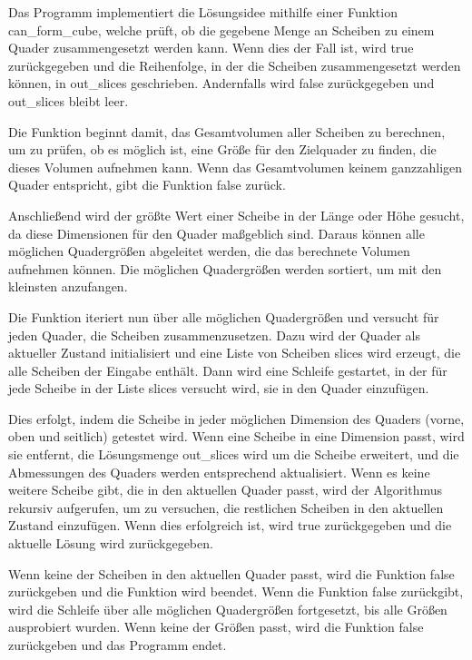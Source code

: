\documentclass[a4paper,10pt,ngerman]{scrartcl}
\begin{document}
    Das Programm implementiert die Lösungsidee mithilfe einer Funktion can_form_cube, welche prüft, ob die gegebene Menge an Scheiben zu einem Quader zusammengesetzt werden kann.
    Wenn dies der Fall ist, wird true zurückgegeben und die Reihenfolge, in der die Scheiben zusammengesetzt werden können, in out_slices geschrieben.
    Andernfalls wird false zurückgegeben und out_slices bleibt leer.

    Die Funktion beginnt damit, das Gesamtvolumen aller Scheiben zu berechnen, um zu prüfen, ob es möglich ist, eine Größe für den Zielquader zu finden, die dieses Volumen aufnehmen kann. Wenn das Gesamtvolumen keinem ganzzahligen Quader entspricht, gibt die Funktion false zurück.

    Anschließend wird der größte Wert einer Scheibe in der Länge oder Höhe gesucht, da diese Dimensionen für den Quader maßgeblich sind.
    Daraus können alle möglichen Quadergrößen abgeleitet werden, die das berechnete Volumen aufnehmen können.
    Die möglichen Quadergrößen werden sortiert, um mit den kleinsten anzufangen.

    Die Funktion iteriert nun über alle möglichen Quadergrößen und versucht für jeden Quader, die Scheiben zusammenzusetzen.
    Dazu wird der Quader als aktueller Zustand initialisiert und eine Liste von Scheiben slices wird erzeugt, die alle Scheiben der Eingabe enthält.
    Dann wird eine Schleife gestartet, in der für jede Scheibe in der Liste slices versucht wird, sie in den Quader einzufügen.

    Dies erfolgt, indem die Scheibe in jeder möglichen Dimension des Quaders (vorne, oben und seitlich) getestet wird.
    Wenn eine Scheibe in eine Dimension passt, wird sie entfernt, die Lösungsmenge out_slices wird um die Scheibe erweitert, und die Abmessungen des Quaders werden entsprechend aktualisiert. Wenn es keine weitere Scheibe gibt, die in den aktuellen Quader passt, wird der Algorithmus rekursiv aufgerufen, um zu versuchen, die restlichen Scheiben in den aktuellen Zustand einzufügen. Wenn dies erfolgreich ist, wird true zurückgegeben und die aktuelle Lösung wird zurückgegeben.

    Wenn keine der Scheiben in den aktuellen Quader passt, wird die Funktion false zurückgeben und die Funktion wird beendet.
    Wenn die Funktion false zurückgibt, wird die Schleife über alle möglichen Quadergrößen fortgesetzt, bis alle Größen ausprobiert wurden.
    Wenn keine der Größen passt, wird die Funktion false zurückgeben und das Programm endet.
\end{document}
